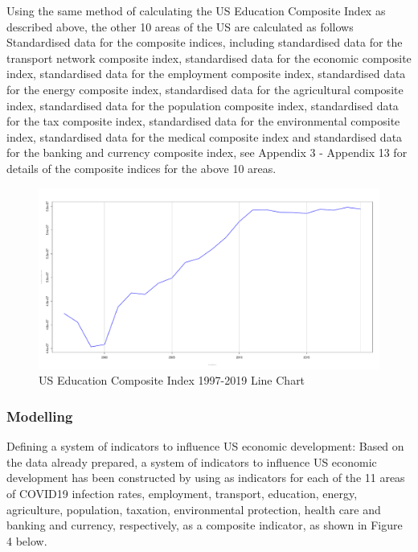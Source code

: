 \documentclass{apmcmthesis}
\begin{document}
Using the same method of calculating the US Education Composite Index as described above, the other 10 areas of the US are calculated as follows
Standardised data for the composite indices, including standardised data for the transport network composite index, standardised data for the economic composite index, standardised data for the employment composite index, standardised data for the energy composite index, standardised data for the agricultural composite index, standardised data for the population composite index, standardised data for the tax composite index, standardised data for the environmental composite index, standardised data for the medical composite index and standardised data for the banking and currency composite index, see Appendix 3 - Appendix 13 for details of the composite indices for the above 10 areas. 
\begin{figure}[H]
	\centering
	\includegraphics[width=\linewidth]{usa_edu}
	\caption{US Education Composite Index 1997-2019 Line Chart}
\end{figure}
\subsubsection{Modelling}
Defining a system of indicators to influence US economic development: Based on the data already prepared, a system of indicators to influence US economic development has been constructed by using as indicators for each of the 11 areas of COVID19 infection rates, employment, transport, education, energy, agriculture, population, taxation, environmental protection, health care and banking and currency, respectively, as a composite indicator, as shown in Figure 4 below.
\end{document}
